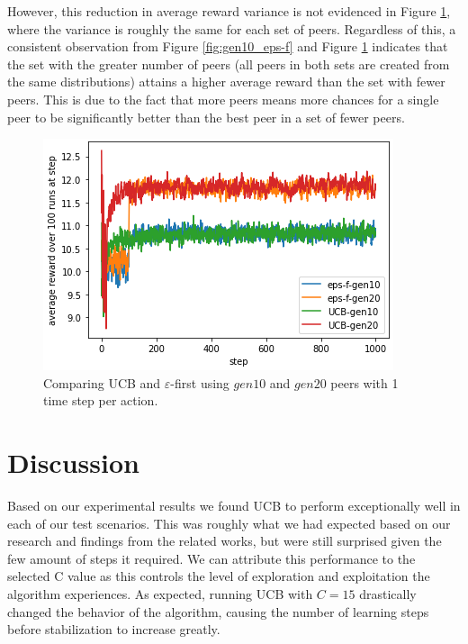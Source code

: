\documentclass{article}
\begin{document}
However, this reduction in average reward variance is not evidenced in Figure \ref{fig:gen10-20_UCB_eps-f}, where the variance is roughly the same for each set of peers. 
Regardless of this, a consistent observation from Figure \ref{fig:gen10_eps-f} and Figure \ref{fig:gen10-20_UCB_eps-f} indicates that the set with the greater number of 
peers (all peers in both sets are created from the same distributions) attains a higher average reward than the set with fewer peers. This is due to the fact that more peers 
means more chances for a single peer to be significantly better than the best peer in a set of fewer peers.
\begin{figure}[h]
    \centering
    \includegraphics[width=1\linewidth]{figs/gen10-20_UCB_eps-f.png}
    \caption{Comparing UCB and $\varepsilon$-first using $gen10$ and $gen20$ peers with 1 time step per action.}
    \label{fig:gen10-20_UCB_eps-f}
\end{figure}

\section{Discussion}

Based on our experimental results we found UCB to perform exceptionally well in each of our test scenarios. This was roughly what we had expected based on our research and 
findings from the related works, but were still surprised given the few amount of steps it required. We can attribute this performance to the selected C value as this 
controls the level of exploration and exploitation the algorithm experiences. As expected, running UCB with $C=15$ drastically changed the behavior of the algorithm, causing 
the number of learning steps before stabilization to increase greatly.
\end{document}
